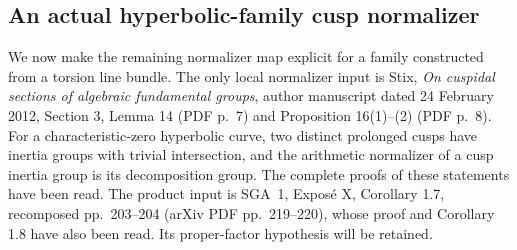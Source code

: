\documentclass[11pt,a4paper]{article}
\begin{document}
\subsection{An actual hyperbolic-family cusp normalizer}
\label{ag:c149-normalizer}

We now make the remaining normalizer map explicit for a family
constructed from a torsion line bundle. The only local normalizer
input is Stix, \emph{On cuspidal sections of algebraic fundamental
groups}, author manuscript dated 24 February 2012, Section 3,
Lemma 14 (PDF p.~7) and Proposition 16(1)--(2) (PDF p.~8).
For a characteristic-zero hyperbolic curve, two distinct prolonged
cusps have inertia groups with trivial intersection, and the
arithmetic normalizer of a cusp inertia group is its decomposition
group. The complete proofs of these statements have been read.
The product input is SGA~1, Expos\'e X, Corollary 1.7, recomposed
pp.~203--204 (arXiv PDF pp.~219--220), whose proof and Corollary 1.8
have also been read. Its proper-factor hypothesis will be retained.
\end{document}
